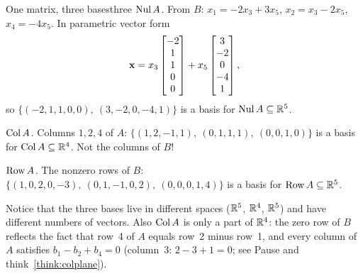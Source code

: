 \documentclass[11pt]{article}
\begin{document}
\begin{exmp}{One matrix, three bases}{three}
\emph{$\operatorname{Nul} A$.} From $B$: $x_1=-2x_3+3x_5$, $x_2=x_3-2x_5$, $x_4=-4x_5$. In parametric vector form
\[
\mathbf{x}=x_3\begin{bmatrix}-2\\1\\1\\0\\0\end{bmatrix}+x_5\begin{bmatrix}3\\-2\\0\\-4\\1\end{bmatrix},
\]
so $\{(-2,1,1,0,0),\ (3,-2,0,-4,1)\}$ is a basis for $\operatorname{Nul} A\subseteq\mathbb{R}^5$.

\emph{$\operatorname{Col} A$.} Columns $1,2,4$ of $A$: $\{(1,2,-1,1),\ (0,1,1,1),\ (0,0,1,0)\}$ is a basis for $\operatorname{Col} A\subseteq\mathbb{R}^4$. Not the columns of $B$!

\emph{$\operatorname{Row} A$.} The nonzero rows of $B$: $\{(1,0,2,0,-3),\ (0,1,-1,0,2),\ (0,0,0,1,4)\}$ is a basis for $\operatorname{Row} A\subseteq\mathbb{R}^5$.

Notice that the three bases live in different spaces ($\mathbb{R}^5$, $\mathbb{R}^4$, $\mathbb{R}^5$) and have different numbers of vectors. Also $\operatorname{Col} A$ is only a part of $\mathbb{R}^4$: the zero row of $B$ reflects the fact that row~4 of $A$ equals row~2 minus row~1, and every column of $A$ satisfies $b_1-b_2+b_4=0$ (column~3: $2-3+1=0$; see Pause and think~\ref{think:colplane}).
\end{exmp}
\end{document}

